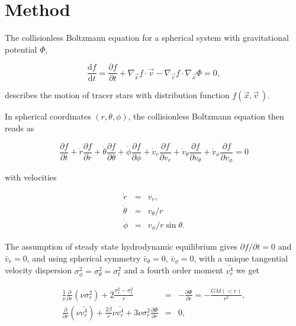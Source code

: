 \section{Method}\label{sec:method}

The collisionless Boltzmann equation for a spherical system with
gravitational potential $\Phi$,

\begin{equation}
\frac{\text{d}f}{\text{d}t} = \frac{\partial f}{\partial t} + \nabla_{\vec{x}} f\cdot\vec{v} - \nabla_{\vec{v}} f\cdot\nabla_{\vec{x}}\Phi = 0,
\end{equation}

describes the motion of tracer stars with distribution function
$f(\vec{x},\vec{v}\,)$.


In spherical coordinates $(r, \theta, \phi)$, the collisionless
Boltzmann equation then reads as

\begin{equation}
\frac{\partial f}{\partial t} + \dot{r}\frac{\partial f}{\partial r} + \dot{\theta}\frac{\partial f}{\partial \theta} + \dot{\phi}\frac{\partial f}{\partial \phi} + \dot{v}_r\frac{\partial f}{\partial v_r}+\dot{v}_\theta\frac{\partial f}{\partial v_\theta} +\dot{v}_\phi\frac{\partial f}{\partial v_\phi} = 0
\end{equation}

with velocities

\begin{eqnarray}
\dot{r}       &=& v_r,\\
\dot{\theta}  &=& v_\theta/r\\
\dot{\phi}    &=& v_\phi / r \sin\theta.
\end{eqnarray}

The assumption of steady state hydrodynamic equilibrium gives
$\partial f/\partial t=0$ and $\bar{v}_r=0$, and using spherical
symmetry $\bar{v}_\theta=0$, $\bar{v}_\phi=0$, with a unique
tangential velocity dispersion
$\sigma_\phi^2=\sigma_\theta^2=\sigma_t^2$ and a fourth order moment $\bar{v_r^4}$ we get

\begin{eqnarray}\label{eq:Jeans}
\frac{1}{\nu}\frac{\partial}{\partial r}(\nu\sigma_{r}^2) + 2\frac{\sigma_{r}^2-\sigma_{t}^2}{r} &=& -\frac{\partial \Phi}{\partial r} = -\frac{GM(<r)}{r^2},\\
\frac{\partial}{\partial r}(\nu\bar{v_r^4})+\frac{2\beta}{r}\nu\bar{v_r^4}+3\nu\sigma_r^2\frac{\partial\Phi}{\partial r}&=&0,
\end{eqnarray}

